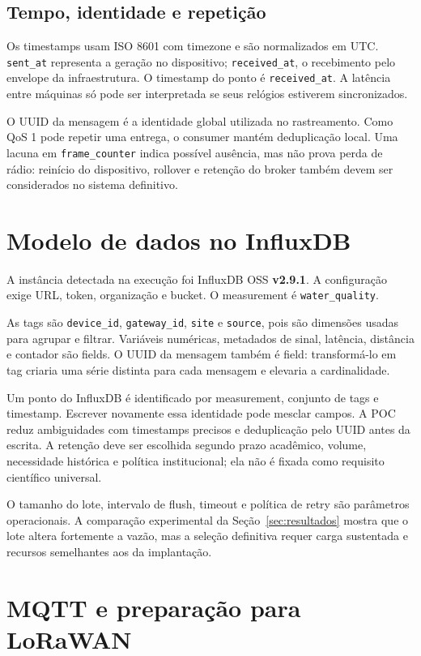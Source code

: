 \documentclass[12pt,a4paper]{article}
\newcommand{\code}[1]{\texttt{#1}}
\begin{document}
\subsection{Tempo, identidade e repetição}

Os timestamps usam ISO 8601 com timezone e são normalizados em UTC. \code{sent\_at} representa a geração no dispositivo; \code{received\_at}, o recebimento pelo envelope da infraestrutura. O timestamp do ponto é \code{received\_at}. A latência entre máquinas só pode ser interpretada se seus relógios estiverem sincronizados.

O UUID da mensagem é a identidade global utilizada no rastreamento. Como QoS 1 pode repetir uma entrega, o consumer mantém deduplicação local. Uma lacuna em \code{frame\_counter} indica possível ausência, mas não prova perda de rádio: reinício do dispositivo, rollover e retenção do broker também devem ser considerados no sistema definitivo.

\section{Modelo de dados no InfluxDB}

A instância detectada na execução foi InfluxDB OSS \textbf{v2.9.1}. A configuração exige URL, token, organização e bucket. O measurement é \code{water\_quality}.

As tags são \code{device\_id}, \code{gateway\_id}, \code{site} e \code{source}, pois são dimensões usadas para agrupar e filtrar. Variáveis numéricas, metadados de sinal, latência, distância e contador são fields. O UUID da mensagem também é field: transformá-lo em tag criaria uma série distinta para cada mensagem e elevaria a cardinalidade.

Um ponto do InfluxDB é identificado por measurement, conjunto de tags e timestamp. Escrever novamente essa identidade pode mesclar campos. A POC reduz ambiguidades com timestamps precisos e deduplicação pelo UUID antes da escrita. A retenção deve ser escolhida segundo prazo acadêmico, volume, necessidade histórica e política institucional; ela não é fixada como requisito científico universal.

O tamanho do lote, intervalo de flush, timeout e política de retry são parâmetros operacionais. A comparação experimental da Seção~\ref{sec:resultados} mostra que o lote altera fortemente a vazão, mas a seleção definitiva requer carga sustentada e recursos semelhantes aos da implantação.

\section{MQTT e preparação para LoRaWAN}
\end{document}
